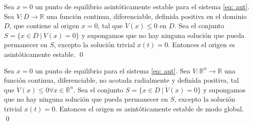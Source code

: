 \begin{corollary}
Sea $x=0$ un punto de equilibrio asintóticamente estable para el sistema \ref{eq: aut}. Sea $V:D\to 	\mathbb{R}$ una función continua, diferenciable, definida positiva en el dominio $D$, que contiene al origen $x=0$, tal que $\dot V(x) \leq 0$ en $D$. Sea el conjunto $S=\{ x \in D\ |\ \dot V(x) = 0 \}$ y supongamos que no hay ninguna solución que pueda permanecer en $S$, excepto la solución trivial $x(t)=0$. Entonces el origen es asintóticamente estable.
\qed
\end{corollary}

\begin{corollary}
Sea $x=0$ un punto de equilibrio para el sistema \ref{eq: aut}. Sea $V:\mathbb{R}^n \to \mathbb{R}$ una función continua, diferenciable, no acotada radialmente y definida positiva, tal que $\dot V(x) \leq 0 \forall x \in \mathbb{R}^n$.  Sea el conjunto $S=\{ x \in D\ |\ \dot V(x) = 0 \}$ y supongamos que no hay ninguna solución que pueda permanecer en $S$, excepto la solución trivial $x(t)=0$. Entonces el origen es asintóticamente estable de modo global.
\qed
\end{corollary}

